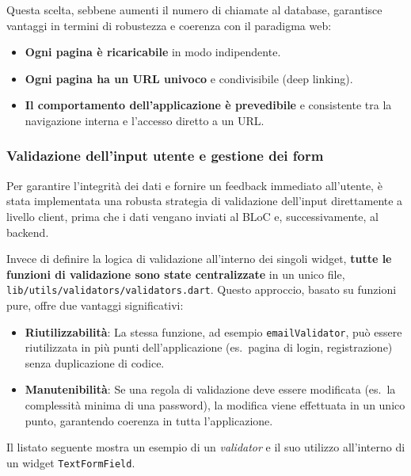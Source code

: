 Questa scelta, sebbene aumenti il numero di chiamate al database, garantisce vantaggi in termini di robustezza e coerenza con il paradigma web:
\begin{itemize}
    \item \textbf{Ogni pagina è ricaricabile} in modo indipendente.
    \item \textbf{Ogni pagina ha un URL univoco} e condivisibile (deep linking).
    \item \textbf{Il comportamento dell'applicazione è prevedibile} e consistente tra la navigazione interna e l'accesso diretto a un URL\@.
\end{itemize}

\subsubsection{Validazione dell'input utente e gestione dei form}
Per garantire l'integrità dei dati e fornire un feedback immediato all'utente, è stata implementata una robusta strategia di validazione dell'input direttamente a livello client, prima che i dati vengano inviati al BLoC e, successivamente, al backend.

Invece di definire la logica di validazione all'interno dei singoli widget, \textbf{tutte le funzioni di validazione sono state centralizzate} in un unico file, \texttt{lib/utils/validators/validators.dart}.
Questo approccio, basato su funzioni pure, offre due vantaggi significativi:
\begin{itemize}
    \item \textbf{Riutilizzabilità}: La stessa funzione, ad esempio \texttt{emailValidator}, può essere riutilizzata in più punti dell'applicazione (es.\ pagina di login, registrazione) senza duplicazione di codice.
    \item \textbf{Manutenibilità}: Se una regola di validazione deve essere modificata (es.\ la complessità minima di una password), la modifica viene effettuata in un unico punto, garantendo coerenza in tutta l'applicazione.
\end{itemize}

Il listato seguente mostra un esempio di un \emph{validator} e il suo utilizzo all'interno di un widget \texttt{TextFormField}.

